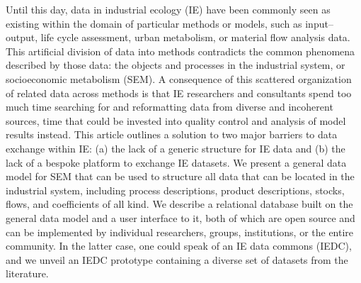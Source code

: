 Until this day, data in industrial ecology (IE) have been commonly seen as existing within the domain of particular methods or models, such as input–output, life cycle assessment, urban metabolism, or material flow analysis data. This artificial division of data into methods contradicts the common phenomena described by those data: the objects and processes in the industrial system, or socioeconomic metabolism (SEM). A consequence of this scattered organization of related data across methods is that IE researchers and consultants spend too much time searching for and reformatting data from diverse and incoherent sources, time that could be invested into quality control and analysis of model results instead. This article outlines a solution to two major barriers to data exchange within IE: (a) the lack of a generic structure for IE data and (b) the lack of a bespoke platform to exchange IE datasets. We present a general data model for SEM that can be used to structure all data that can be located in the industrial system, including process descriptions, product descriptions, stocks, flows, and coefficients of all kind. We describe a relational database built on the general data model and a user interface to it, both of which are open source and can be implemented by individual researchers, groups, institutions, or the entire community. In the latter case, one could speak of an IE data commons (IEDC), and we unveil an IEDC prototype containing a diverse set of datasets from the literature.
